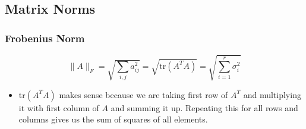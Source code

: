 \subsection{Matrix Norms}
\subsubsection{Frobenius Norm}
\begin{definition}
    \begin{equation*}
        \|A\|_F = \sqrt{\sum_{i,j} a_{ij}^2} = \sqrt{\text{tr}(A^T A)} = \sqrt{\sum_{i=1}^r \sigma_i^2}
        \end{equation*}
\end{definition}

\begin{intuition}
    \begin{itemize}
        \item $\text{tr}(A^TA)$ makes sense because we are taking first row of $A^T$ and multiplying it with first column of $A$ and summing it up. Repeating this for all rows and columns gives us the sum of squares of all elements.
    \end{itemize}
\end{intuition}

